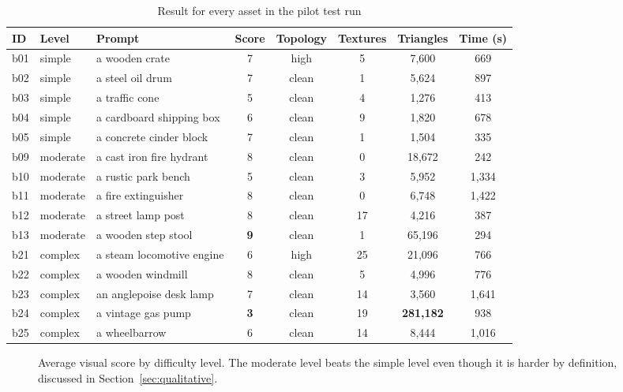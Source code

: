 \documentclass[conference]{IEEEtran}
\begin{document}
\begin{table}[t]
\centering
\caption{Result for every asset in the pilot test run}
\label{tab:perasset}
\small
\begin{tabular}{lllccccc}
\toprule
ID & Level & Prompt & Score & Topology & Textures & Triangles & Time (s) \\
\midrule
b01 & simple   & a wooden crate                 & 7 & high  & 5  & 7{,}600   & 669 \\
b02 & simple   & a steel oil drum               & 7 & clean & 1  & 5{,}624   & 897 \\
b03 & simple   & a traffic cone                 & 5 & clean & 4  & 1{,}276   & 413 \\
b04 & simple   & a cardboard shipping box       & 6 & clean & 9  & 1{,}820   & 678 \\
b05 & simple   & a concrete cinder block        & 7 & clean & 1  & 1{,}504   & 335 \\
b09 & moderate & a cast iron fire hydrant       & 8 & clean & 0  & 18{,}672  & 242 \\
b10 & moderate & a rustic park bench            & 5 & clean & 3  & 5{,}952   & 1{,}334 \\
b11 & moderate & a fire extinguisher            & 8 & clean & 0  & 6{,}748   & 1{,}422 \\
b12 & moderate & a street lamp post             & 8 & clean & 17 & 4{,}216   & 387 \\
b13 & moderate & a wooden step stool            & \textbf{9} & clean & 1  & 65{,}196  & 294 \\
b21 & complex  & a steam locomotive engine      & 6 & high  & 25 & 21{,}096  & 766 \\
b22 & complex  & a wooden windmill              & 8 & clean & 5  & 4{,}996   & 776 \\
b23 & complex  & an anglepoise desk lamp        & 7 & clean & 14 & 3{,}560   & 1{,}641 \\
b24 & complex  & a vintage gas pump             & \textbf{3} & clean & 19 & \textbf{281{,}182} & 938 \\
b25 & complex  & a wheelbarrow                  & 6 & clean & 14 & 8{,}444   & 1{,}016 \\
\bottomrule
\end{tabular}
\end{table}

\begin{figure}[t]
\centering
{}
\caption{Average visual score by difficulty level. The moderate level beats the simple level even though it is harder by definition, discussed in Section~\ref{sec:qualitative}.}
\label{fig:tierbar}
\end{figure}
\end{document}
